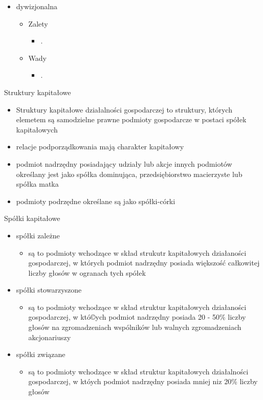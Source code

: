 \documentclass[a4paper,10pt]{report}
\begin{document}
\begin{itemize}
\begin{itemize}
\begin{itemize}
		\end{itemize}
	\end{itemize}	
	\item dywizjonalna
	\begin{itemize}
		\item Zalety
		\begin{itemize}
			\item .
		\end{itemize}
		\item Wady
		\begin{itemize}
			\item .
		\end{itemize}
	\end{itemize}
\end{itemize}

Struktury kapitałowe
\begin{itemize}
	\item Struktury kapitałowe działalności gospodarczej to struktury, których elemetem są samodzielne prawne podmioty gospodarcze w postaci spółek kapitałowych
	\item relacje podporządkowania mają charakter kapitałowy
	\item podmiot nadrzędny posiadający udziały lub akcje innych podmiotów określany jest jako spółka dominująca, przedsiębiorstwo macierzyste lub spółka matka
	\item podmioty podrzędne określane są jako spółki-córki
\end{itemize}

Spółki kapitałowe
\begin{itemize}
	\item spółki zależne
	\begin{itemize}
		\item są to podmioty wchodzące w skład strukutr kapitałowych działaności gospodarczej, w których podmiot nadrzędny posiada większość całkowitej liczby głosów w ogranach tych spółek
	\end{itemize}
	\item spółki stowarzyszone
	\begin{itemize}
		\item są to podmioty wchodzące w skład struktur kapitałowych działaności gospodarczej, w któ©ych podmiot nadrzędny posiada 20 - 50\% liczby głosów na zgromadzeniach wspólników lub walnych zgromadzeniach akcjonariuszy
	\end{itemize}
	\item spółki związane
	\begin{itemize}
		\item są to podmioty wchodzące w skład struktur kapitałowych działalności gospodarczej, w któych podmiot nadrzędny posiada mniej niz 20\% liczby głosów
	\end{itemize}
\end{itemize}
\end{document}
